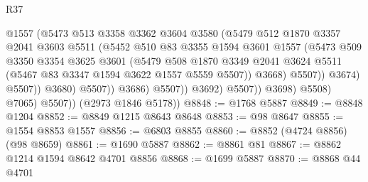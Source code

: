 \begin{lexlean}{R37}
\begin{coremodule}
                                      @1557
                                      (@5473
                                        @513
                                        @3358
                                        @3362
                                        @3604
                                        @3580
                                        (@5479
                                          @512
                                          @1870
                                          @3357
                                          @2041
                                          @3603
                                          @5511
                                          (@5452
                                            @510
                                            @83
                                            @3355
                                            @1594
                                            @3601
                                            @1557
                                            (@5473
                                              @509
                                              @3350
                                              @3354
                                              @3625
                                              @3601
                                              (@5479
                                                @508
                                                @1870
                                                @3349
                                                @2041
                                                @3624
                                                @5511
                                                (@5467 @83 @3347 @1594 @3622 @1557 @5559 @5507))
                                              @3668)
                                            @5507))
                                        @3674)
                                      @5507))
                                  @3680)
                                @5507))
                            @3686)
                          @5507))
                      @3692)
                    @5507))
                @3698)
              @5508)
            @7065)
          @5507))
      (@2973 @1846 @5178))
@8848 := @1768 @5887
@8849 := @8848 @1204
@8852 := @8849 @1215 @8643 @8648
@8853 := @98 @8647
@8855 := @1554 @8853 @1557
@8856 := @6803 @8855
@8860 := @8852 (@4724 @8856) (@98 @8659)
@8861 := @1690 @5887
@8862 := @8861 @81
@8867 := @8862 @1214 @1594 @8642 @4701 @8856
@8868 := @1699 @5887
@8870 := @8868 @44 @4701

\end{coremodule}
\end{lexlean}

